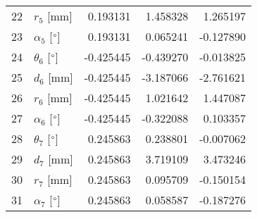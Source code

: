 \documentclass{standalone}%
\begin{document}
\begin{tabular}{llrrr}
22 &              $r_{5}$ [mm] &  0.193131 &   1.458328 &   1.265197 \\
23 &  $\alpha_{5}$ [$\degree$] &  0.193131 &   0.065241 &  -0.127890 \\
24 &  $\theta_{6}$ [$\degree$] & -0.425445 &  -0.439270 &  -0.013825 \\
25 &              $d_{6}$ [mm] & -0.425445 &  -3.187066 &  -2.761621 \\
26 &              $r_{6}$ [mm] & -0.425445 &   1.021642 &   1.447087 \\
27 &  $\alpha_{6}$ [$\degree$] & -0.425445 &  -0.322088 &   0.103357 \\
28 &  $\theta_{7}$ [$\degree$] &  0.245863 &   0.238801 &  -0.007062 \\
29 &              $d_{7}$ [mm] &  0.245863 &   3.719109 &   3.473246 \\
30 &              $r_{7}$ [mm] &  0.245863 &   0.095709 &  -0.150154 \\
31 &  $\alpha_{7}$ [$\degree$] &  0.245863 &   0.058587 &  -0.187276 \\
\bottomrule
\end{tabular}
%
\end{document}
